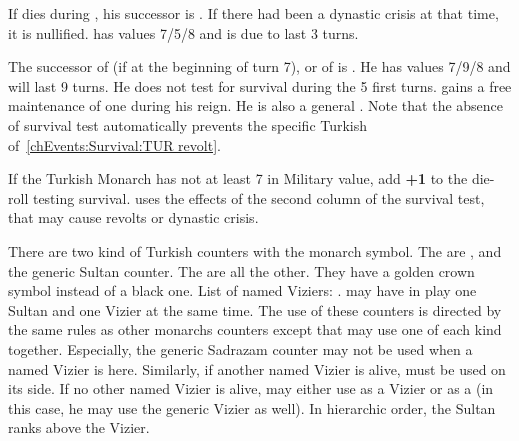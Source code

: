  If  dies
during , his successor is . If there had
been a dynastic crisis at that time, it is nullified.  has values 7/5/8 and is due to last 3 turns.

 The successor of  (if at the beginning of turn 7), or of  is
. He has values 7/9/8 and will last 9 turns. He does
not test for survival during the 5 first turns. \TUR gains a free
maintenance of one \ARMY\faceplus \Janissaire during his reign. He is
also a general .
\bparag Note that the absence of survival test automatically prevents the
specific Turkish \REVOLT of~\ref{chEvents:Survival:TUR revolt}.

 If the Turkish
Monarch has not at least 7 in Military value, add {\bf +1} to the
die-roll testing survival.
\bparag \TUR uses the effects of the second column of the survival test,
that may cause revolts or dynastic crisis.


 There are two kind of Turkish
counters with the monarch symbol.
\bparag The  are \leaderSuleyman, \leaderSelim and the
generic Sultan counter.
\bparag The  are all the other. They have a golden crown
symbol instead of a black one.
\bparag List of named Viziers: .
\bparag \TUR may have in play one Sultan and one Vizier at the same
time. The use of these counters is directed by the same rules as other
monarchs counters except that \TUR may use one of each kind together.
\bparag Especially, the generic Sadrazam counter may not be used when
a named Vizier is here.
\bparag Similarly, if another named Vizier is alive, \leaderSinan must
be used on its \LeaderC side. If no other named Vizier is alive, \TUR
may either use \leaderSinan as a Vizier or as a \LeaderC (in this
case, he may use the generic Vizier as well).
\bparag In hierarchic order, the Sultan ranks above the Vizier.


